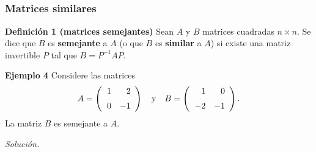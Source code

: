 
\subsection{}
%
\begin{frame}\frametitle{Matrices similares}
	
	\begin{block}{\textbf{Definición 1 (matrices semejantes)}}
		\justifying
		Sean $A$ y $B$ matrices cuadradas $n\times n$. Se dice que $B$ es \textbf{semejante } a $A$ (o que $B$ es \textbf{similar} a $A$) si existe una matriz invertible $P$ tal que $B=P^{-1}AP$.
	\end{block}
	
	
	\begin{ej}{\textbf{Ejemplo 4}}
		\justifying
		Considere las matrices
		\[
		A = 
		\left( 
		\begin{array}{@{\hspace{1\tabcolsep}}rr}	
		1 & 2 \\[2mm] 
		0 & -1
		\end{array} 
		\right)
		\quad \text{y} \quad
		B = 
		\left( 
		\begin{array}{@{\hspace{1\tabcolsep}}rr}	
		1 & 0 \\[2mm] 
		-2 & -1		
		\end{array} 
		\right).
		\]
		La matriz $B$ es semejante a $A$.
	\end{ej}

	\textit{Solución.}
	
\end{frame}


